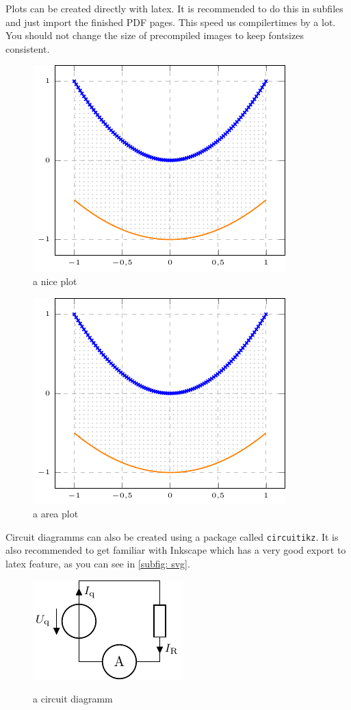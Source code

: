 \documentclass[	%
		fontsize=11pt,  %
		a4paper,	    %
		twoside,		%
		english,		%
		sans,			%
		f1				%
	]{HsH-report}		%
\begin{document}
	\pagebreak
	Plots can be created directly with latex. It is recommended to do this in subfiles and just import the finished PDF pages. This speed us
	compilertimes by a lot. You should not change the size of precompiled images to keep fontsizes consistent.
	\begin{figure}
		\includegraphics[page=2]{plt/examplePlot.pdf}
		\caption[centering]{a nice plot}
		\label{fig: plot1}
	\end{figure}
	\begin{figure}
		\includegraphics[page=1]{plt/examplePlot.pdf}
		\caption{a area plot}
		\label{fig: area}
	\end{figure}

	Circuit diagramms can also be created using a package called \lstinline{circuitikz}. It is also recommended to get familiar with Inkscape which
	has a very good export to latex feature, as you can see in \autoref{subfig: svg}.
	\begin{figure}
		\includegraphics{crc/exampleCircuit.pdf}
		\label{subfig: circuit}
		\caption{a circuit diagramm}
	\end{figure}
\end{document}
